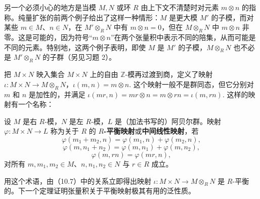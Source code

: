 另一个必须小心的地方是当模 \(M, N\) 或环 \(R\) 由上下文不清楚时对元素 \(m \otimes n\) 的指称。纯量扩张的前两个例子给出了这样一种情形：\(M\) 是更大模 \(M'\) 的子模，而对某些 \(m \in M\)、\(n \in N\)，在 \(M' \otimes_R N\) 中有 \(m \otimes n = 0\)，但在 \(M \otimes_R N\) 中 \(m \otimes n\) 非零。这是可能的，因为符号“\(m \otimes n\)”在两个张量积中表示不同的陪集，从而可能是不同的元素。特别地，这两个例子表明，即使 \(M\) 是 \(M'\) 的子模，\(M \otimes_R N\) 也不必是 \(M' \otimes_R N\) 的子群（另见习题 2）。

把 \(M \times N\) 映入集合 \(M \times N\) 上的自由 \(\mathbb{Z}\)-模再过渡到商，定义了映射 \(\iota : M \times N \to M \otimes_R N\)，\(\iota(m, n) = m \otimes n\). 这个映射一般不是群同态，但它分别对 \(m\) 和 \(n\) 是加性的，并满足 \(\iota(mr, n) = mr \otimes n = m \otimes rn = \iota(m, rn)\). 这样的映射有一个名称：

\begin{definition}
设 \(M\) 是右 \(R\)-模，\(N\) 是左 \(R\)-模，\(L\) 是（加法书写的）阿贝尔群。映射 \(\varphi : M \times N \to L\) 称为关于 \(R\) 的 \textbf{\(R\)-平衡映射}或\textbf{中间线性映射}，若
\[
\varphi(m_1+m_2, n) = \varphi(m_1, n)+\varphi(m_2, n),
\]
\[
\varphi(m, n_1+n_2) = \varphi(m, n_1)+\varphi(m, n_2),
\]
\[
\varphi(m, rn) = \varphi(mr, n),
\]
对所有 \(m, m_1, m_2 \in M\)、\(n, n_1, n_2 \in N\) 与 \(r \in R\) 成立。
\end{definition}

用这个术语，由（10.7）中的关系立即得出映射 \(\iota : M \times N \to M \otimes_R N\) 是 \(R\)-平衡的。下一个定理证明张量积关于平衡映射极其有用的泛性质。


